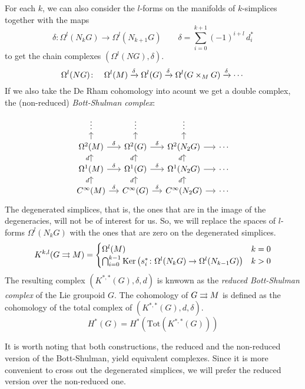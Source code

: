 For each $k$, we can also consider the $l$-forms on the manifolds of $k$-simplices together with the maps
\[ \delta\colon \Omega^l(N_kG)\to \Omega^l(N_{k+1}G) \qquad \delta = \sum_{i=0}^{k+1} (-1)^{i+l} \, d_i^* \]
to get the chain complexes $(\Omega^l(NG), \delta)$.
\[ \Omega^l(NG)\colon \quad \Omega^l(M) \xrightarrow{\delta} \Omega^l(G) \xrightarrow{\delta} \Omega^l(G\times_M G) \xrightarrow{\delta} \cdots \]
If we also take the De Rham cohomology into acount we get a double complex, the (non-reduced) \emph{Bott-Shulman complex}:
\begin{equation}
\begin{tikzcd}[sep = small]
  \vdots & \vdots & \vdots \\
  \Omega^2(M) \ar{u} \ar{r}{\delta} & \Omega^2(G) \ar{u} \ar{r}{\delta} & \Omega^2(N_2G) \ar{u} \ar{r} & \cdots \\
  \Omega^1(M) \ar{u}{d} \ar{r}{\delta} & \Omega^1(G) \ar{u}{d} \ar{r}{\delta} & \Omega^1(N_2G) \ar{u}{d} \ar{r} & \cdots \\
  C^\infty(M) \ar{u}{d} \ar{r}{\delta} & C^\infty(G) \ar{u}{d} \ar{r}{\delta} & C^\infty(N_2G) \ar{u}{d} \ar{r} & \cdots
\end{tikzcd}
\end{equation}
%
The degenerated simplices, that is, the ones that are in the image of the degeneracies, will not be of interest for us.
So, we will replace the spaces of $l$-forms $\Omega^l(N_kG)$ with the ones that are zero on the degenerated simplices.
\begin{equation}
K^{k,l}(G\rightrightarrows M) =
\begin{cases}
    \Omega^l(M) & k = 0 \\
    \bigcap_{i=0}^{k-1} \operatorname{Ker}\left( s_i^*\colon \Omega^l(N_kG) \to \Omega^l(N_{k-1}G) \right) & k > 0
\end{cases}
\end{equation}
The resulting complex $(K^{*,*}(G),\delta,d)$ is knwown as the \emph{reduced Bott-Shulman complex} of the Lie groupoid $G$.
%
The cohomology of $G\rightrightarrows M$ is defined as the cohomology of the total complex of $(K^{*,*}(G), d, \delta)$.
\[ H^*(G) = H^*(\text{Tot}(K^{*,*}(G))) \]

It is worth noting that both constructions, the reduced and the non-reduced version of the Bott-Shulman, yield equivalent complexes.
Since it is more convenient to cross out the degenerated simplices, we will prefer the reduced version over the non-reduced one.

